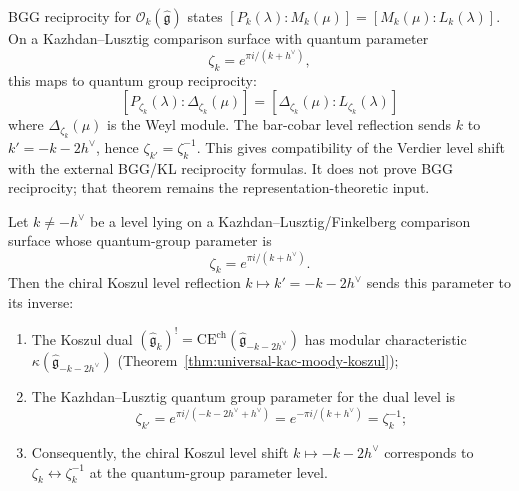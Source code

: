 \begin{remark}\label{rem:category-O-affine}\label{rem:bgg-kl-bridge}
BGG reciprocity for $\mathcal{O}_k(\widehat{\mathfrak{g}})$ states $[P_k(\lambda) : M_k(\mu)] = [M_k(\mu) : L_k(\lambda)]$. On a Kazhdan--Lusztig comparison surface with quantum parameter
\[
\zeta_k=e^{\pi i/(k+h^\vee)},
\]
this maps to quantum group reciprocity:
\[
[P_{\zeta_k}(\lambda) : \Delta_{\zeta_k}(\mu)]
=
[\Delta_{\zeta_k}(\mu) : L_{\zeta_k}(\lambda)]
\]
where $\Delta_{\zeta_k}(\mu)$ is the Weyl module.  The bar-cobar
level reflection sends \(k\) to \(k'=-k-2h^\vee\), hence
\(\zeta_{k'}=\zeta_k^{-1}\).  This gives compatibility of the
Verdier level shift with the external BGG/KL reciprocity formulas.
It does not prove BGG reciprocity; that theorem remains the
representation-theoretic input.
\end{remark}

\begin{theorem}\label{thm:km-quantum-groups}
Let \(k\neq-h^\vee\) be a level lying on a
Kazhdan--Lusztig/Finkelberg comparison surface whose quantum-group
parameter is
\[
\zeta_k=e^{\pi i/(k+h^\vee)}.
\]
Then the chiral Koszul level reflection \(k\mapsto k'=-k-2h^\vee\)
sends this parameter to its inverse:
\begin{enumerate}[label=\textup{(\roman*)}]
\item The Koszul dual $(\widehat{\mathfrak{g}}_k)^! = \mathrm{CE}^{\mathrm{ch}}(\widehat{\mathfrak{g}}_{-k-2h^\vee})$
has modular characteristic $\kappa(\widehat{\mathfrak{g}}_{-k-2h^\vee})$
\textup{(}Theorem~\textup{\ref{thm:universal-kac-moody-koszul});}
\item The Kazhdan--Lusztig quantum group parameter for the dual level is
\begin{equation}\label{eq:q-inversion}
\zeta_{k'} = e^{\pi i/(-k-2h^\vee + h^\vee)}
= e^{-\pi i/(k+h^\vee)}
= \zeta_k^{-1};
\end{equation}
\item Consequently, the chiral Koszul level shift $k \mapsto -k - 2h^\vee$
corresponds to \(\zeta_k\leftrightarrow \zeta_k^{-1}\) at the
quantum-group parameter level.
\end{enumerate}
\end{theorem}

